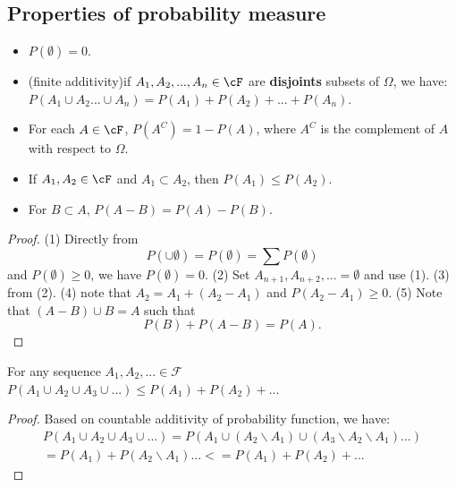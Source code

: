 \begin{refsection}
\begin{example}
\begin{itemize}
\begin{itemize}
	\end{itemize}
\end{itemize}	





\end{example}




\subsection{Properties of probability measure}

\begin{lemma}\cite[11]{hoggintroduction}
\begin{itemize}
	\item $P({\emptyset}) = 0$.
	\item (finite additivity)if $A_1,A_2,...,A_n \in \cF$ are \textbf{disjoints} subsets of $\Omega$, we have:
	$P(A_1\cup A_2 ... \cup A_n) = P(A_1) + P(A_2) + ... + P(A_n).$
	\item For each $A\in \cF$, $P(A^C) = 1 - P(A)$, where $A^C$ is the complement of $A$ with respect to $\Omega$.
	\item If $A_1,A_2 \in \cF$ and $A_1\subset A_2$, then $P(A_1)\leq P(A_2)$.
	\item For $B\subset A$, $P(A-B) = P(A) - P(B)$.
\end{itemize}	
\end{lemma}
\begin{proof}
(1) Directly from 
$$P(\cup \emptyset) = P(\emptyset) = \sum P(\emptyset)$$
and $P(\emptyset) \geq 0$, we have $P(\emptyset) = 0$.
(2) Set $A_{n+1},A_{n+2},... = \emptyset$ and use (1). (3) from (2). (4) note that $A_2 = A_1 + (A_2-A_1)$ and $P(A_2-A_1)\geq 0$.
(5) Note that $(A-B)\cup B = A$ such that
$$P(B) + P(A-B) = P(A).$$
\end{proof}





\begin{lemma}
For any sequence $A_1,A_2,... \in \mathcal{F}$
$P(A_1\cup A_2 \cup A_3 \cup ...) \leq P(A_1) + P(A_2) + ... $
\end{lemma}
\begin{proof}
 Based on countable additivity of probability function, we have:
\begin{align*}
P(A_1\cup A_2 \cup A_3 \cup ...) = P(A_1 \cup (A_2\backslash A_1) \cup (A_3\backslash A_2 \backslash A_1)...)\\
= P(A_1) + P(A_2 \backslash A_1) ... <= P(A_1) + P(A_2) + ...    
\end{align*}
\end{proof}




\end{refsection}
